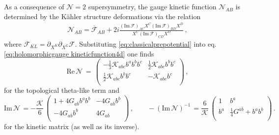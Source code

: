 As a consequence of $\mathcal{N}=2$ supersymmetry, the gauge kinetic function $\mathcal{N}_{AB}$ is determined by the K\"ahler structure deformations via the relation 
%
\begin{equation}\label{eq:holomorphicgauge kineticfunction4d}
\begin{aligned}
\mathcal{N}_{AB}= \overline{\mathcal{F}}_{AB} + 2i \frac{(\text{Im}\, \mathcal{F})_{AC}X^C (\text{Im}\, \mathcal{F})_{BD} X^D}{X^C (\text{Im}\, \mathcal{F})_{CD} X^D}\, , 
\end{aligned}
\end{equation}
%
where $\mathcal{F}_{KL}=\partial_{X^K}\partial_{X^L} \mathcal{F}$. Substituting \eqref{eq:classicalprepotential} into eq. \eqref{eq:holomorphicgauge kineticfunction4d} one finds
%
\begin{equation}\label{eq:gaugetopologicalterm}
	\text{Re}\, \mathcal{N}\, = \, \left(
		\begin{array}{cc}
			-\frac{1}{3} \mathcal{K}_{abc}b^a b^b b^c & \frac{1}{2} \mathcal{K}_{abc}b^b b^c  \\
			\frac{1}{2}\mathcal{K}_{abc}b^b b^c & -\mathcal{K}_{abc} b^c  \\
		\end{array}
		\right) \, ,
\end{equation}
%
for the topological theta-like term and
%
\begin{equation}\label{eq:gaugekineticmatrix}
	\text{Im}\, \mathcal{N}\, = -\frac{\mathcal{K}}{6} \, \left(
		\begin{array}{cc}
			1+4G_{a\bar b}b^a b^b & -4G_{a\bar b} b^b  \\
			-4G_{a\bar b} b^b & 4G_{a\bar b}  \\
		\end{array}
		\right) \, ,\qquad 
		-(\text{Im}\, \mathcal{N})^{-1}\, = \frac{6}{\mathcal{K}} \, \left(
		\begin{array}{cc}
			1 &  b^a  \\
			b^a & \frac{1}{4} G^{a\bar b} + b^a b^b  \\
		\end{array}
		\right) \, .
\end{equation}
%
for the kinetic matrix (as well as its inverse).

